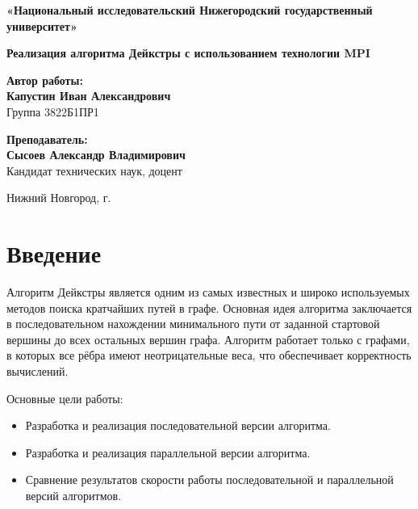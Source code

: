 \documentclass[a4paper,14pt]{extarticle}
\begin{document}
\begin{titlepage}
    \begin{center}
        \vspace*{-2cm} 
        {\large \textbf{«Национальный исследовательский Нижегородский государственный университет»}}
        
        \vspace{4cm} 
        {\LARGE \textbf{Реализация алгоритма Дейкстры с использованием технологии MPI}}
        
        \vspace{3cm} 
        \textbf{Автор работы:}\\
        \vspace{0.5cm}
        \textbf{Капустин Иван Александрович}\\
        Группа 3822Б1ПР1
        
        \vspace{1.5cm}
        \textbf{Преподаватель:}\\
        \vspace{0.5cm}
        \textbf{Сысоев Александр Владимирович}\\
        Кандидат технических наук, доцент
        
        \vfill 
        Нижний Новгород, \the\year{} г.
    \end{center}
\end{titlepage}

\section*{Введение}

Алгоритм Дейкстры является одним из самых известных и широко используемых методов поиска кратчайших путей в графе. Основная идея алгоритма заключается в последовательном нахождении минимального пути от заданной стартовой вершины до всех остальных вершин графа. Алгоритм работает только с графами, в которых все рёбра имеют неотрицательные веса, что обеспечивает корректность вычислений.

Основные цели работы:
\begin{itemize}
    \item Разработка и реализация последовательной версии алгоритма.
    \item Разработка и реализация параллельной версии алгоритма.
    \item Сравнение результатов скорости работы последовательной и параллельной версий алгоритмов.
\end{itemize}
\end{document}
